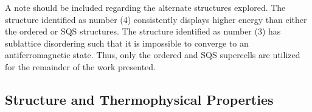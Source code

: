 \documentclass[preprint,12pt]{elsarticle}
\begin{document}

A note should be included regarding the alternate structures explored. The structure identified as number (4) consistently displays higher energy than either the ordered or SQS structures. The structure identified as number (3) has sublattice disordering such that it is impossible to converge to an antiferromagnetic state. Thus, only the ordered and SQS supercells are utilized for the remainder of the work presented. 

\subsection{Structure and Thermophysical Properties}
\end{document}
